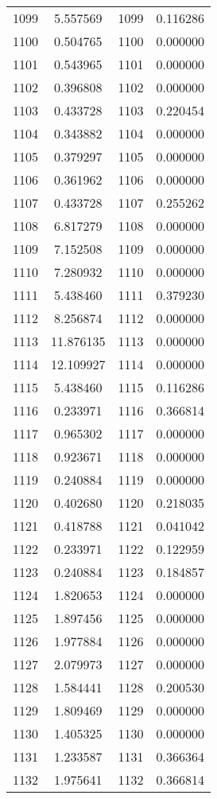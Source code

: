 \documentclass[12pt]{article}
\begin{document}
\begin{longtable}{@{}cccc@{}}
1099 & 5.557569 & 1099 & 0.116286 \\
1100 & 0.504765 & 1100 & 0.000000 \\
1101 & 0.543965 & 1101 & 0.000000 \\
1102 & 0.396808 & 1102 & 0.000000 \\
1103 & 0.433728 & 1103 & 0.220454 \\
1104 & 0.343882 & 1104 & 0.000000 \\
1105 & 0.379297 & 1105 & 0.000000 \\
1106 & 0.361962 & 1106 & 0.000000 \\
1107 & 0.433728 & 1107 & 0.255262 \\
1108 & 6.817279 & 1108 & 0.000000 \\
1109 & 7.152508 & 1109 & 0.000000 \\
1110 & 7.280932 & 1110 & 0.000000 \\
1111 & 5.438460 & 1111 & 0.379230 \\
1112 & 8.256874 & 1112 & 0.000000 \\
1113 & 11.876135 & 1113 & 0.000000 \\
1114 & 12.109927 & 1114 & 0.000000 \\
1115 & 5.438460 & 1115 & 0.116286 \\
1116 & 0.233971 & 1116 & 0.366814 \\
1117 & 0.965302 & 1117 & 0.000000 \\
1118 & 0.923671 & 1118 & 0.000000 \\
1119 & 0.240884 & 1119 & 0.000000 \\
1120 & 0.402680 & 1120 & 0.218035 \\
1121 & 0.418788 & 1121 & 0.041042 \\
1122 & 0.233971 & 1122 & 0.122959 \\
1123 & 0.240884 & 1123 & 0.184857 \\
1124 & 1.820653 & 1124 & 0.000000 \\
1125 & 1.897456 & 1125 & 0.000000 \\
1126 & 1.977884 & 1126 & 0.000000 \\
1127 & 2.079973 & 1127 & 0.000000 \\
1128 & 1.584441 & 1128 & 0.200530 \\
1129 & 1.809469 & 1129 & 0.000000 \\
1130 & 1.405325 & 1130 & 0.000000 \\
1131 & 1.233587 & 1131 & 0.366364 \\
1132 & 1.975641 & 1132 & 0.366814 \\

\end{longtable}
\end{document}

